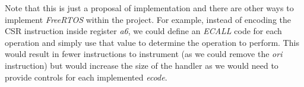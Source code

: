 Note that this is just a proposal of implementation and there are other ways to
implement \textit{FreeRTOS} within the project. For example, instead of encoding
the CSR instruction inside register \textit{a6}, we could define an \textit{ECALL}
code for each operation and simply use that value to determine the operation to
perform. This would result in fewer instructions to instrument (as we could
remove the \textit{ori} instruction) but would increase the size of the handler
as we would need to provide controls for each implemented \textit{ecode}.
